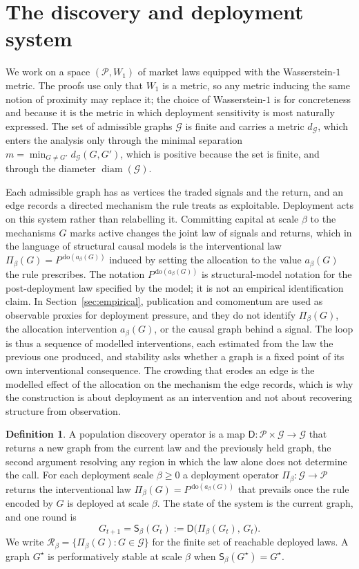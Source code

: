 \documentclass[11pt]{article}
\theoremstyle{plain}
\theoremstyle{definition}
\newtheorem{definition}{Definition}
\newcommand{\Pcal}{\mathcal{P}}
\newcommand{\Gcal}{\mathcal{G}}
\newcommand{\Rset}{\mathcal{R}}
\newcommand{\Wone}{W_1}
\newcommand{\Dop}{\mathsf{D}}
\newcommand{\Pidep}{\Pi_\beta}
\newcommand{\Sbeta}{\mathsf{S}_\beta}
\newcommand{\diam}{\operatorname{diam}}
\begin{document}
\section{The discovery and deployment system}\label{sec:setup}

We work on a space $(\Pcal,\Wone)$ of market laws equipped with the Wasserstein-$1$ metric. The proofs use only that $\Wone$ is a metric, so any metric inducing the same notion of proximity may replace it; the choice of Wasserstein-$1$ is for concreteness and because it is the metric in which deployment sensitivity is most naturally expressed. The set of admissible graphs $\Gcal$ is finite and carries a metric $d_\Gcal$, which enters the analysis only through the minimal separation $m=\min_{G\neq G'}d_\Gcal(G,G')$, which is positive because the set is finite, and through the diameter $\diam(\Gcal)$.

Each admissible graph has as vertices the traded signals and the return, and an edge records a directed mechanism the rule treats as exploitable. Deployment acts on this system rather than relabelling it. Committing capital at scale $\beta$ to the mechanisms $G$ marks active changes the joint law of signals and returns, which in the language of structural causal models is the interventional law $\Pidep(G)=P^{\,\mathrm{do}(a_\beta(G))}$ induced by setting the allocation to the value $a_\beta(G)$ the rule prescribes. The notation $P^{\,\mathrm{do}(a_\beta(G))}$ is structural-model notation for the post-deployment law specified by the model; it is not an empirical identification claim. In Section~\ref{sec:empirical}, publication and comomentum are used as observable proxies for deployment pressure, and they do not identify $\Pidep(G)$, the allocation intervention $a_\beta(G)$, or the causal graph behind a signal. The loop is thus a sequence of modelled interventions, each estimated from the law the previous one produced, and stability asks whether a graph is a fixed point of its own interventional consequence. The crowding that erodes an edge is the modelled effect of the allocation on the mechanism the edge records, which is why the construction is about deployment as an intervention and not about recovering structure from observation.

\begin{definition}\label{def:loop}
A population discovery operator is a map $\Dop:\Pcal\times\Gcal\to\Gcal$ that returns a new graph from the current law and the previously held graph, the second argument resolving any region in which the law alone does not determine the call. For each deployment scale $\beta\ge0$ a deployment operator $\Pidep:\Gcal\to\Pcal$ returns the interventional law $\Pidep(G)=P^{\,\mathrm{do}(a_\beta(G))}$ that prevails once the rule encoded by $G$ is deployed at scale $\beta$. The state of the system is the current graph, and one round is
\begin{equation}\label{eq:update}
G_{t+1}=\Sbeta(G_t):=\Dop\!\big(\Pidep(G_t),\,G_t\big).
\end{equation}
We write $\Rset_\beta=\{\Pidep(G):G\in\Gcal\}$ for the finite set of reachable deployed laws. A graph $G^\star$ is performatively stable at scale $\beta$ when $\Sbeta(G^\star)=G^\star$.
\end{definition}
\end{document}
